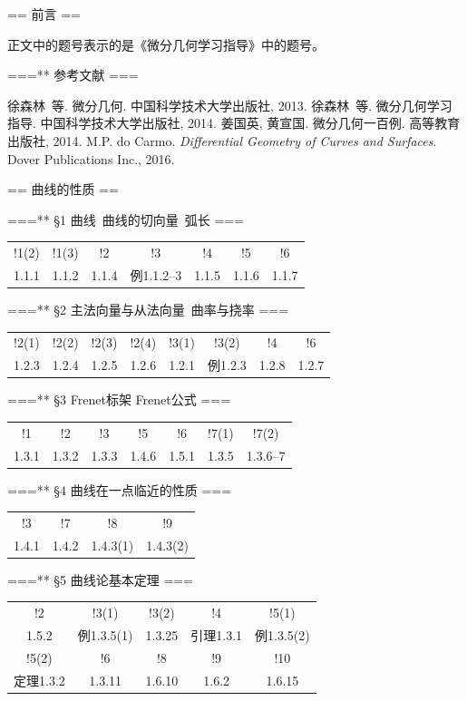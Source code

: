 \setcounter{section}{-1}
\def\r{\boldsymbol{r}}
\def\n{\boldsymbol{n}}
\def\v{\boldsymbol{v}}

== 前言 ==

正文中的题号表示的是《微分几何学习指导》中的题号。

===** 参考文献 ===
\begin{references}
        徐森林\ 等. 微分几何. 中国科学技术大学出版社, 2013.
        徐森林\ 等. 微分几何学习指导. 中国科学技术大学出版社, 2014.
        姜国英, 黄宣国. 微分几何一百例. 高等教育出版社, 2014.
        M.P. do Carmo. \textit{Differential Geometry of Curves and Surfaces}. 
        Dover Publications Inc., 2016.
\end{references}

== 曲线的性质 ==

===** \S1 曲线\ 曲线的切向量\ 弧长 ===
\begin{tabular}{ccccccc}
    !1(2)&!1(3)&!2&!3&!4&!5&!6\\
    1.1.1&1.1.2&1.1.4&例1.1.2--3&1.1.5&1.1.6&1.1.7
\end{tabular}

===** \S2 主法向量与从法向量\ 曲率与挠率 ===
\begin{tabular}{cccccccc}
    !2(1)&!2(2)&!2(3)&!2(4)&!3(1)&!3(2)&!4&!6\\
    1.2.3&1.2.4&1.2.5&1.2.6&1.2.1&例1.2.3&1.2.8&1.2.7
\end{tabular}

===** \S3 Frenet标架 Frenet公式 ===
\begin{tabular}{ccccccc}
    !1&!2&!3&!5&!6&!7(1)&!7(2)\\
    1.3.1&1.3.2&1.3.3&1.4.6&1.5.1&1.3.5&1.3.6--7
\end{tabular}

===** \S4 曲线在一点临近的性质 ===
\begin{tabular}{cccc}
    !3&!7&!8&!9\\
    1.4.1&1.4.2&1.4.3(1)&1.4.3(2)
\end{tabular}

===** \S5 曲线论基本定理 ===
\begin{tabular}{ccccc}
    !2&!3(1)&!3(2)&!4&!5(1)\\
    1.5.2&例1.3.5(1)&1.3.25&引理1.3.1&例1.3.5(2)\\
    !5(2)&!6&!8&!9&!10\\
    定理1.3.2&1.3.11&1.6.10&1.6.2&1.6.15
\end{tabular}


